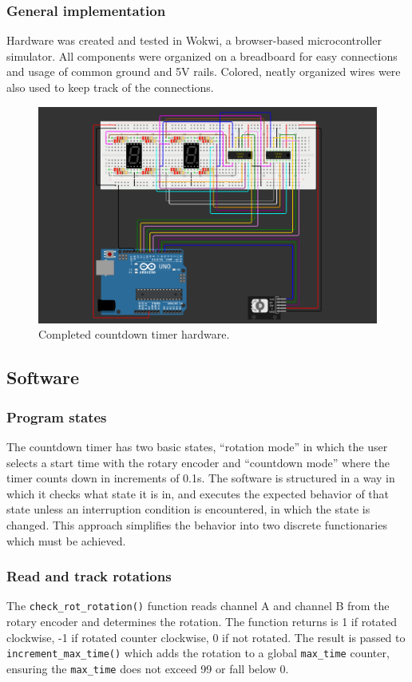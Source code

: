\documentclass[fleqn]{article}
\begin{document}
\subsubsection*{General implementation}
Hardware was created and tested in Wokwi, a browser-based microcontroller simulator. All components were organized on a breadboard for easy connections and usage of common ground and 5V rails. Colored, neatly organized wires were also used to keep track of the connections.
\begin{figure}[H]
    \centering
    \includegraphics[width=5in]{circut.png}
    \caption{Completed countdown timer hardware.}
\end{figure}

\subsection*{Software}
\subsubsection*{Program states}
The countdown timer has two basic states, ``rotation mode'' in which the user selects a start time with the rotary encoder and ``countdown mode'' where the timer counts down in increments of 0.1s. The software is structured in a way in which it checks what state it is in, and executes the expected behavior of that state unless an interruption condition is encountered, in which the state is changed. This approach simplifies the behavior into two discrete functionaries which must be achieved.

\subsubsection*{Read and track rotations}
The \verb|check_rot_rotation()| function reads channel A and channel B from the rotary encoder and determines the rotation. The function returns is 1 if rotated clockwise, -1 if rotated counter clockwise, 0 if not rotated. The result is passed to \verb|increment_max_time()| which adds the rotation to a global \verb|max_time| counter, ensuring the \verb|max_time| does not exceed 99 or fall below 0.
\end{document}
